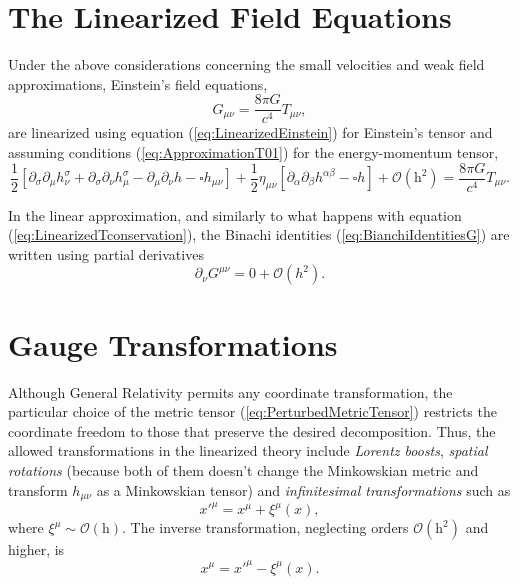 \section{The Linearized Field Equations}
Under the above considerations concerning the small velocities and weak field approximations, Einstein's field equations,
\begin{equation}
G_{\mu \nu} = \frac{8\pi G}{c^4}  T_{\mu \nu} ,
\end{equation}
are linearized using equation (\ref{eq:LinearizedEinstein}) for Einstein's tensor and assuming conditions (\ref{eq:ApproximationT01}) for the energy-momentum tensor,
\begin{equation}
\frac{1}{2} \left[ \partial _\sigma \partial _\mu h ^\sigma _\nu + \partial _\sigma \partial _\nu h ^\sigma _\mu - \partial _\mu \partial _\nu h - \square h_{\mu \nu} \right] + \frac{1}{2} \eta_{\mu \nu} \left[ \partial _\alpha \partial _\beta h^{\alpha \beta} - \square h  \right] + \mathcal{O} ( \textrm{h}^2 )= \frac{8\pi G}{c^4} T_{\mu \nu}  . \label{eq:LinearizedFieldEquations}
\end{equation}

In the linear approximation, and similarly to what happens with equation (\ref{eq:LinearizedTconservation}), the Binachi identities (\ref{eq:BianchiIdentitiesG}) are written using partial derivatives
\begin{equation}
\partial_\nu G^{\mu \nu} = 0 + \mathcal{O} (h^2 ).
\end{equation}

\section{Gauge Transformations}
Although General Relativity permits any coordinate transformation, the particular choice of the metric tensor (\ref{eq:PerturbedMetricTensor}) restricts the coordinate freedom to those that preserve the desired decomposition. Thus, the allowed transformations in the linearized theory include \textit{Lorentz boosts}, \textit{spatial rotations} (because both of them doesn't change the Minkowskian metric and transform $h_{\mu \nu}$ as a Minkowskian tensor) and \textit{infinitesimal transformations} such as
\begin{equation}
x'^\mu = x^\mu + \xi^\mu ( x ), \label{eq:InfinitesimalTransformation}
\end{equation}
where $\xi^\mu \sim \mathcal{O} ( \textrm{h} ) $. The inverse transformation, neglecting orders $\mathcal{O} ( \textrm{h}^2 )$ and higher, is 
\begin{equation}
x^\mu = x'^\mu - \xi^\mu ( x ).
\end{equation}

